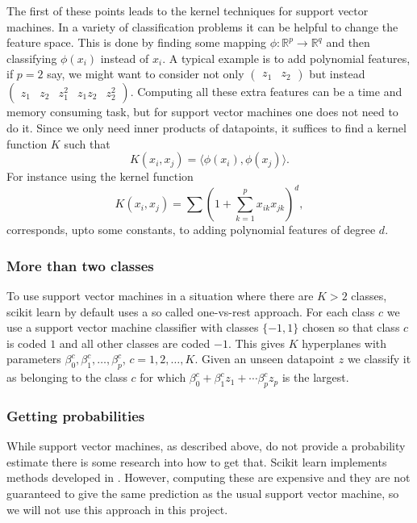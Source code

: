 \documentclass[parskip=half]{scrartcl}
\theoremstyle{definition}
\theoremstyle{remark}
\newcommand{\R}{\mathbb{R}}
\begin{document}
The first of these points leads to the kernel techniques for support vector machines.
In a variety of classification problems it can be helpful to change the feature space. 
This is done by finding some mapping $\phi \colon \R^p \to \R^q$ and then classifying $\phi(x_i)$ instead of $x_i$. 
A typical example is to add polynomial features, if $p = 2$ say, we might want to consider not only $\begin{pmatrix} z_1 & z_2 \end{pmatrix}$ but instead $\begin{pmatrix} z_1 & z_2 & z_1^2 & z_1 z_2 & z_2^2 \end{pmatrix}$.  
Computing all these extra features can be a time and memory consuming task, but for support vector machines one does not need to do it. 
Since we only need inner products of datapoints, it suffices to find a kernel function $K$ such that 
\[
	K(x_i, x_j) = \langle \phi(x_i), \phi(x_j) \rangle.
\]
For instance using the kernel function
\[
	K(x_i, x_j) = \sum \left( 1 + \sum_{k=1}^p x_{ik} x_{jk} \right)^d,
\]
corresponds, upto some constants, to adding polynomial features of degree $d$. 

\subsubsection{More than two classes}

To use support vector machines in a situation where there are $K > 2$ classes, scikit learn by default uses a so called one-vs-rest approach. 
For each class $c$ we use a support vector machine classifier with classes $\{-1, 1\}$ chosen so that class $c$ is coded $1$ and all other classes are coded $-1$.
This gives $K$ hyperplanes with parameters $\beta_0^c, \beta_1^c, \ldots, \beta_p^c$, $c = 1,2,\ldots, K$.
Given an unseen datapoint $z$ we classify it as belonging to the class $c$ for which $\beta_0^c + \beta_1^c z_1 + \cdots \beta_p^c z_p$ is the largest.    

\subsubsection{Getting probabilities}

While support vector machines, as described above, do not provide a probability estimate there is some research into how to get that. 
Scikit learn implements methods developed in \cite{wual}.
However, computing these are expensive and they are not guaranteed to give the same prediction as the usual support vector machine, so we will not use this approach in this project. 
  
\end{document}
